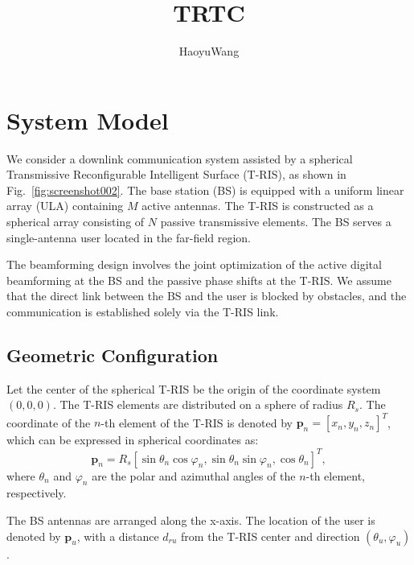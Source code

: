 \documentclass[journal,comsoc]{IEEEtran}
\title{TRTC}
\author{HaoyuWang}
\begin{document}
\section{System Model}

We consider a downlink communication system assisted by a spherical Transmissive Reconfigurable Intelligent Surface (T-RIS), as shown in Fig.~\ref{fig:screenshot002}. The base station (BS) is equipped with a uniform linear array (ULA) containing $M$ active antennas. The T-RIS is constructed as a spherical array consisting of $N$ passive transmissive elements. The BS serves a single-antenna user located in the far-field region.

The beamforming design involves the joint optimization of the active digital beamforming at the BS and the passive phase shifts at the T-RIS. We assume that the direct link between the BS and the user is blocked by obstacles, and the communication is established solely via the T-RIS link.

\subsection{Geometric Configuration}
Let the center of the spherical T-RIS be the origin of the coordinate system $(0,0,0)$. The T-RIS elements are distributed on a sphere of radius $R_s$. The coordinate of the $n$-th element of the T-RIS is denoted by $\mathbf{p}_n = [x_n, y_n, z_n]^T$, which can be expressed in spherical coordinates as:
\begin{equation}
	\mathbf{p}_n = R_s [\sin\theta_n \cos\varphi_n, \sin\theta_n \sin\varphi_n, \cos\theta_n]^T,
\end{equation}
where $\theta_n$ and $\varphi_n$ are the polar and azimuthal angles of the $n$-th element, respectively.

The BS antennas are arranged along the x-axis. The location of the user is denoted by $\mathbf{p}_u$, with a distance $d_{ru}$ from the T-RIS center and direction $(\theta_u, \varphi_u)$.
\end{document}
